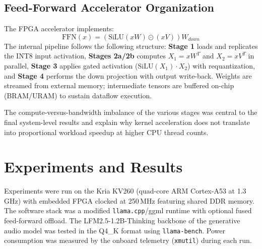 \documentclass[runningheads]{llncs}
\begin{document}
\subsection{Feed-Forward Accelerator Organization}
The FPGA accelerator implements:
$$ \text{FFN}(x) = (\text{SiLU}(x W) \odot (x V)) W_{down} $$
The internal pipeline follows the following structure: \textbf{Stage 1} loads
and replicates the INT8 input activation, \textbf{Stages 2a/2b} computes $X_1
= x W^{T}$ and $X_2 = x V^{T}$ in parallel, \textbf{Stage 3} applies gated
activation ($\mathrm{SiLU}(X_1)\cdot X_2$) with requantization, and
\textbf{Stage 4} performs the down projection with output write-back. Weights
are streamed from external memory; intermediate tensors are buffered on-chip
(BRAM/URAM) to sustain dataflow execution.

The compute-versus-bandwidth imbalance of the various stages was central to
the final system-level results and explain why kernel acceleration does not
translate into proportional workload speedup at higher CPU thread counts.

\section{Experiments and Results}\label{sec:results}
Experiments were run on the Kria KV260 (quad-core ARM Cortex-A53 at 1.3\,GHz) with
embedded FPGA clocked at 250\,MHz featuring shared DDR memory. The software
stack was a modified \texttt{llama.cpp}/ggml runtime with optional fused
feed-forward offload. The LFM2.5-1.2B-Thinking backbone of the generative
audio model was tested in the Q4\_K format using \texttt{llama-bench}. Power
consumption was measured by the onboard telemetry (\texttt{xmutil}) during
each run.
\end{document}
